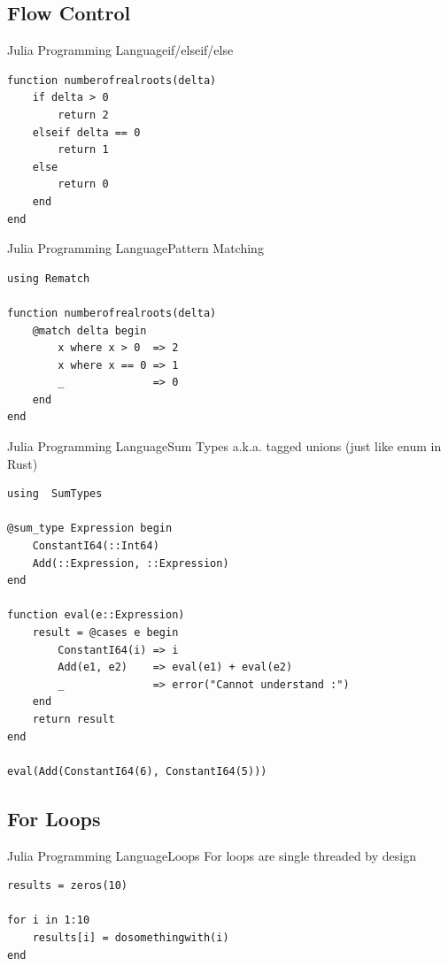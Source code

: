 \documentclass[11pt]{beamer}
\begin{document}
\subsection{Flow Control}
\begin{frame}[fragile]{Julia Programming Language}{if/elseif/else}
\begin{lstlisting}
function numberofrealroots(delta)
	if delta > 0 
		return 2
	elseif delta == 0
		return 1
	else
		return 0
	end
end  
\end{lstlisting}
\end{frame}

\begin{frame}[fragile]{Julia Programming Language}{Pattern Matching}
\begin{lstlisting}
using Rematch

function numberofrealroots(delta)
    @match delta begin
        x where x > 0  => 2
        x where x == 0 => 1
        _              => 0
    end 
end
\end{lstlisting}
\end{frame}


\begin{frame}[fragile]{Julia Programming Language}{Sum Types a.k.a. tagged unions (just like enum in Rust)}
\begin{lstlisting}[basicstyle=\tiny]
using  SumTypes 

@sum_type Expression begin
    ConstantI64(::Int64)
    Add(::Expression, ::Expression)
end

function eval(e::Expression) 
    result = @cases e begin 
        ConstantI64(i) => i 
        Add(e1, e2)    => eval(e1) + eval(e2)
        _              => error("Cannot understand :")
    end 
    return result
end 

eval(Add(ConstantI64(6), ConstantI64(5)))
\end{lstlisting}
\end{frame}


\subsection{For Loops}
\begin{frame}[fragile]{Julia Programming Language}{Loops}
For loops are single threaded by design
\begin{lstlisting}
results = zeros(10)

for i in 1:10
	results[i] = dosomethingwith(i)
end 
\end{lstlisting}
\end{frame}
\end{document}
